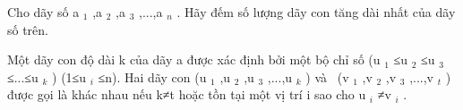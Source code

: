 Cho dãy số a   $_    1   $   ,a   $_    2   $   ,a   $_    3   $   ,...,a   $_    n   $   .  Hãy đếm số lượng dãy con tăng dài nhất của dãy số trên.  

   Một dãy  con độ dài k của dãy a được xác định bởi một bộ chỉ số (u   $_    1   $   ≤u   $_    2   $   ≤u   $_    3   $   ≤...≤u   $_    k   $   )  (1≤u   $_    i   $   ≤n). Hai dãy con (u   $_    1   $   ,u   $_    2   $   ,u   $_    3   $   ,...,u   $_    k   $   )  và  (v   $_    1   $   ,v   $_    2   $   ,v   $_    3   $   ,...,v   $_    t   $   ) được  gọi là khác nhau nếu k≠t hoặc tồn tại một vị trí i sao cho u   $_    i   $   ≠v   $_    i   $   .